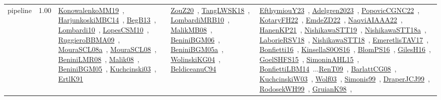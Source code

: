 {\begin{longtable}{p{3cm}r>{\raggedright\arraybackslash}p{6cm}>{\raggedright\arraybackslash}p{6cm}>{\raggedright\arraybackslash}p{8cm}}
\index{pipeline}\index{ApplicationAreas!pipeline}pipeline &  1.00 & \href{../works/KonowalenkoMM19.pdf}{KonowalenkoMM19}~\cite{KonowalenkoMM19}, \href{../works/HarjunkoskiMBC14.pdf}{HarjunkoskiMBC14}~\cite{HarjunkoskiMBC14}, \href{../works/BegB13.pdf}{BegB13}~\cite{BegB13}, \href{../works/Lombardi10.pdf}{Lombardi10}~\cite{Lombardi10}, \href{../works/LopesCSM10.pdf}{LopesCSM10}~\cite{LopesCSM10}, \href{../works/RuggieroBBMA09.pdf}{RuggieroBBMA09}~\cite{RuggieroBBMA09}, \href{../works/MouraSCL08a.pdf}{MouraSCL08a}~\cite{MouraSCL08a}, \href{../works/MouraSCL08.pdf}{MouraSCL08}~\cite{MouraSCL08}, \href{../works/BeniniLMR08.pdf}{BeniniLMR08}~\cite{BeniniLMR08}, \href{../works/Malik08.pdf}{Malik08}~\cite{Malik08}, \href{../works/BeniniBGM05.pdf}{BeniniBGM05}~\cite{BeniniBGM05}, \href{../works/Kuchcinski03.pdf}{Kuchcinski03}~\cite{Kuchcinski03}, \href{../works/ErtlK91.pdf}{ErtlK91}~\cite{ErtlK91} & \href{../works/ZouZ20.pdf}{ZouZ20}~\cite{ZouZ20}, \href{../works/TangLWSK18.pdf}{TangLWSK18}~\cite{TangLWSK18}, \href{../works/LombardiMRB10.pdf}{LombardiMRB10}~\cite{LombardiMRB10}, \href{../works/MalikMB08.pdf}{MalikMB08}~\cite{MalikMB08}, \href{../works/BeniniBGM06.pdf}{BeniniBGM06}~\cite{BeniniBGM06}, \href{../works/BeniniBGM05a.pdf}{BeniniBGM05a}~\cite{BeniniBGM05a}, \href{../works/WolinskiKG04.pdf}{WolinskiKG04}~\cite{WolinskiKG04}, \href{../works/BeldiceanuC94.pdf}{BeldiceanuC94}~\cite{BeldiceanuC94} & \href{../works/EfthymiouY23.pdf}{EfthymiouY23}~\cite{EfthymiouY23}, \href{../works/Adelgren2023.pdf}{Adelgren2023}~\cite{Adelgren2023}, \href{../works/PopovicCGNC22.pdf}{PopovicCGNC22}~\cite{PopovicCGNC22}, \href{../works/KotaryFH22.pdf}{KotaryFH22}~\cite{KotaryFH22}, \href{../works/EmdeZD22.pdf}{EmdeZD22}~\cite{EmdeZD22}, \href{../works/NaqviAIAAA22.pdf}{NaqviAIAAA22}~\cite{NaqviAIAAA22}, \href{../works/HanenKP21.pdf}{HanenKP21}~\cite{HanenKP21}, \href{../works/NishikawaSTT19.pdf}{NishikawaSTT19}~\cite{NishikawaSTT19}, \href{../works/NishikawaSTT18a.pdf}{NishikawaSTT18a}~\cite{NishikawaSTT18a}, \href{../works/LaborieRSV18.pdf}{LaborieRSV18}~\cite{LaborieRSV18}, \href{../works/NishikawaSTT18.pdf}{NishikawaSTT18}~\cite{NishikawaSTT18}, \href{../works/EmeretlisTAV17.pdf}{EmeretlisTAV17}~\cite{EmeretlisTAV17}, \href{../works/Bonfietti16.pdf}{Bonfietti16}~\cite{Bonfietti16}, \href{../works/KinsellaS0OS16.pdf}{KinsellaS0OS16}~\cite{KinsellaS0OS16}, \href{../works/BlomPS16.pdf}{BlomPS16}~\cite{BlomPS16}, \href{../works/GilesH16.pdf}{GilesH16}~\cite{GilesH16}, \href{../works/GoelSHFS15.pdf}{GoelSHFS15}~\cite{GoelSHFS15}, \href{../works/SimoninAHL15.pdf}{SimoninAHL15}~\cite{SimoninAHL15}, \href{../works/BonfiettiLBM14.pdf}{BonfiettiLBM14}~\cite{BonfiettiLBM14}...\href{../works/RenT09.pdf}{RenT09}~\cite{RenT09}, \href{../works/BarlattCG08.pdf}{BarlattCG08}~\cite{BarlattCG08}, \href{../works/KuchcinskiW03.pdf}{KuchcinskiW03}~\cite{KuchcinskiW03}, \href{../works/Wolf03.pdf}{Wolf03}~\cite{Wolf03}, \href{../works/Simonis99.pdf}{Simonis99}~\cite{Simonis99}, \href{../works/DraperJCJ99.pdf}{DraperJCJ99}~\cite{DraperJCJ99}, \href{../works/RodosekWH99.pdf}{RodosekWH99}~\cite{RodosekWH99}, \href{../works/GruianK98.pdf}{GruianK98}~\cite{GruianK98}, 
\end{longtable}}
